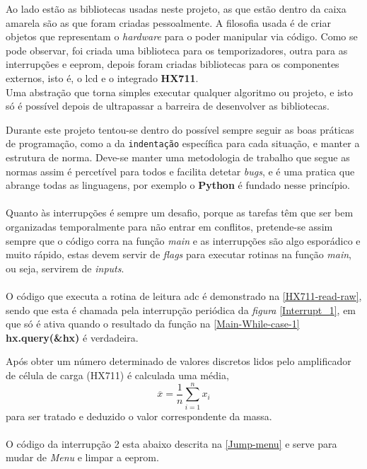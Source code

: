 \hspace{2pt}
\begin{minipage}{.6\linewidth}
	Ao lado estão as bibliotecas usadas neste projeto, as que estão dentro da caixa amarela são as que foram criadas pessoalmente.
	A filosofia usada é de criar objetos que representam o \textit{hardware} para o poder manipular via código. Como se pode observar, foi criada uma biblioteca para os temporizadores, outra para as interrupções e \ac{eeprom}, depois foram criadas bibliotecas para os componentes externos, isto é, o \acs{lcd} e o integrado \textbf{HX711}.
	\\
	Uma abstração que torna simples executar qualquer algoritmo ou projeto, e isto só é possível depois de ultrapassar a barreira de desenvolver as bibliotecas.
\end{minipage}
Durante este projeto tentou-se dentro do possível sempre seguir as boas práticas de programação, como a da \texttt{indentação} específica para cada situação, e manter a estrutura de norma. Deve-se manter uma metodologia de trabalho que segue as normas assim é percetível para todos e facilita detetar \textit{bugs}, e é uma pratica que abrange todas as linguagens, por exemplo o \textbf{Python} é fundado nesse princípio.
\\
\\
Quanto às interrupções é sempre um desafio, porque as tarefas têm que ser bem organizadas temporalmente para não entrar em conflitos, pretende-se assim sempre que o código corra na função \textit{main} e as interrupções são algo esporádico e muito rápido, estas devem servir de \textit{flags} para executar rotinas na função \textit{main}, ou seja, servirem de \textit{inputs}. %
\\
\\
O código que executa a rotina de leitura \acs{adc} é demonstrado na \autoref{HX711-read-raw}, sendo que esta é chamada pela interrupção periódica da \textit{figura} \ref{Interrupt_1}, em que só é ativa quando o resultado da função na \autoref{Main-While-case-1} \textbf{hx.query(\&hx)} é verdadeira.
{
	
}
{
	
}
Após obter um número determinado de valores discretos lidos pelo amplificador de célula de carga (HX711) é calculada uma média,
\begin{equation}
	\label{eq:Mean}
	\overline{x}  =  \frac{1}{n}\sum_{i=1}^n x_i
\end{equation}
para ser tratado e deduzido o valor correspondente da massa.
\\
\\
O código da interrupção 2 esta abaixo descrita na \autoref{Jump-menu} e serve para mudar de \textit{Menu} e limpar a \acs{eeprom}.
{
	
}
